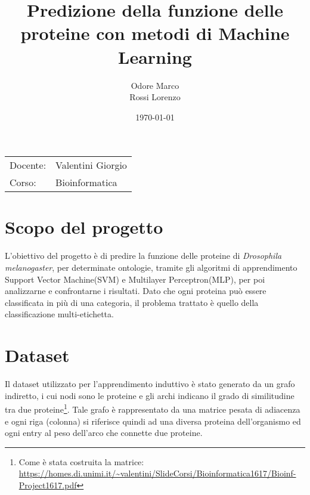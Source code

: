 \documentclass{article}
\title{Predizione della funzione delle proteine con
metodi di Machine Learning} %
\author{Odore Marco \\ Rossi Lorenzo} %
\date{\today} %
\begin{document}
\maketitle %

\begin{center}
\begin{tabular}{l l}

Docente: & Valentini Giorgio \\%
Corso: & Bioinformatica
\end{tabular}
\end{center}



\section{Scopo del progetto}

L'obiettivo del progetto è di predire la funzione delle proteine di \emph{Drosophila
melanogaster}, per determinate ontologie, tramite gli algoritmi di apprendimento Support Vector Machine(SVM) e Multilayer Perceptron(MLP), per poi analizzarne e confrontarne i risultati. Dato che ogni proteina può essere classificata in più di una categoria, il problema trattato è quello della classificazione multi-etichetta.

\section{Dataset}
Il dataset utilizzato per l'apprendimento induttivo è stato generato da un grafo indiretto, i cui nodi sono le proteine e gli archi indicano il grado di similitudine tra due proteine\footnote{Come è stata costruita la matrice:\\ \url{https://homes.di.unimi.it/~valentini/SlideCorsi/Bioinformatica1617/Bioinf-Project1617.pdf}}. Tale grafo è rappresentato da una matrice pesata  di  adiacenza e ogni  riga  (colonna)  si  riferisce quindi  ad  una  diversa  proteina  dell'organismo  ed  ogni  entry  al  peso  dell'arco che connette due proteine.
\end{document}
